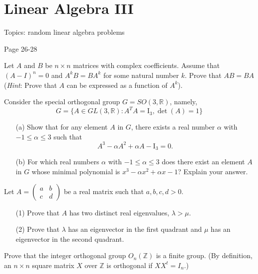 \chapter{Linear Algebra III}
Topics: random linear algebra problems

Page 26-28


\begin{prob}[S2013-Q5]
    Let \(A\) and \(B\) be \(n \times n\) matrices with complex coefficients. Assume that \((A - I)^n = 0\) and \(A^k B = BA^k\) for some natural number \(k\). Prove that \(AB = BA\) (\textit{Hint}: Prove that \(A\) can be expressed as a function of \(A^k\)).
\end{prob}

\begin{prob}[F2011-Q2]
    Consider the special orthogonal group \(G=SO(3,\mathbb{R})\), namely,
    \[G=\{A\in GL(3,\mathbb{R}): A^T A=\mathrm{I}_3, \det(A)=1\}\]
    \begin{itemize}
        \item[(a)] Show that for any element \(A\) in \(G\), there exists a real number \(\alpha\) with \(-1\leq\alpha\leq 3\) such that
        \[A^3-\alpha A^2+\alpha A-\mathrm{I}_3=0.\]
        \item[(b)] For which real numbers \(\alpha\) with \(-1\leq\alpha\leq 3\) does there exist an element \(A\) in \(G\) whose minimal polynomial is \(x^3-\alpha x^2+\alpha x-1\)? Explain your answer.
    \end{itemize}
\end{prob}


\begin{prob}[F2007-Q3]
    Let \(A = \begin{pmatrix} a & b \\ c & d \end{pmatrix}\) be a real matrix such that \(a,b,c,d > 0\).
    \begin{itemize}
        \item[(1)] Prove that \(A\) has two distinct real eigenvalues, \(\lambda > \mu\).
        \item[(2)] Prove that \(\lambda\) has an eigenvector in the first quadrant and \(\mu\) has an eigenvector in the second quadrant.
    \end{itemize}
\end{prob}


\begin{prob}[S2007-Q1]
    Prove that the integer orthogonal group \(O_n(\mathbb{Z})\) is a finite group. (By definition, an \(n \times n\) square matrix \(X\) over \(\mathbb{Z}\) is orthogonal if \(XX^t = I_n\).)
\end{prob}

